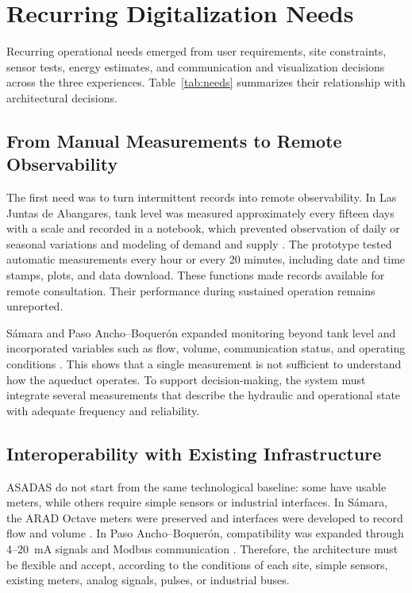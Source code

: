 \documentclass[conference]{IEEEtran}
\begin{document}
\section{Recurring Digitalization Needs}
Recurring operational needs emerged from user requirements, site constraints, sensor tests, energy estimates, and communication and visualization decisions across the three experiences. Table~\ref{tab:needs} summarizes their relationship with architectural decisions.

\subsection{From Manual Measurements to Remote Observability}
The first need was to turn intermittent records into remote observability. In Las Juntas de Abangares, tank level was measured approximately every fifteen days with a scale and recorded in a notebook, which prevented observation of daily or seasonal variations and modeling of demand and supply \cite{chavarria2021implementacion}. The prototype tested automatic measurements every hour or every 20 minutes, including date and time stamps, plots, and data download. These functions made records available for remote consultation. Their performance during sustained operation remains unreported.

Sámara and Paso Ancho--Boquerón expanded monitoring beyond tank level and incorporated variables such as flow, volume, communication status, and operating conditions \cite{solorzano2021sistema,oviedo2024desarrollo}. This shows that a single measurement is not sufficient to understand how the aqueduct operates. To support decision-making, the system must integrate several measurements that describe the hydraulic and operational state with adequate frequency and reliability.

\subsection{Interoperability with Existing Infrastructure}
ASADAS do not start from the same technological baseline: some have usable meters, while others require simple sensors or industrial interfaces. In Sámara, the ARAD Octave meters were preserved and interfaces were developed to record flow and volume \cite{solorzano2021sistema}. In Paso Ancho--Boquerón, compatibility was expanded through 4--20~mA signals and Modbus communication \cite{oviedo2024desarrollo}. Therefore, the architecture must be flexible and accept, according to the conditions of each site, simple sensors, existing meters, analog signals, pulses, or industrial buses.
\end{document}
